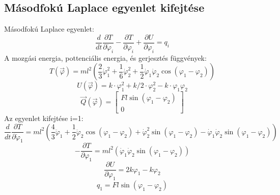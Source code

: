\documentclass[12pt,twoside]{article}
\begin{document}
\subsection{Másodfokú Laplace egyenlet kifejtése}%
Másodfokú Laplace egyenlet:
\begin{equation} \label{eq:Newton}
\frac{d}{dt}\frac{\partial T}{\partial \dot \varphi_i}-\frac{\partial T}{\partial \varphi_i}+\frac{\partial U}{\partial \varphi_i}=q_i
\end{equation}
A mozgási energia, pottenciális energia, és gerjesztés függvények:
\begin{equation} \label{eq:Newton}
T(\vec\varphi)=ml^2\left(\frac{2}{3}\dot\varphi_1^2+\frac{1}{6}\dot\varphi_2^2+
\frac{1}{2}\dot\varphi_1\dot\varphi_2 \cos(\varphi_1-\varphi_2)\right)
\end{equation}
\begin{equation} \label{eq:Newton}
U(\vec\varphi)=k \cdot \varphi_1 ^2 + k/2 \cdot\varphi_2^2 -k \cdot \varphi_1\varphi_2
\end{equation}
\begin{equation} \label{eq:Newton}
\vec Q(\vec\varphi)=
\begin{bmatrix}
Fl\sin(\varphi_1-\varphi_2) \\
0
\end{bmatrix}
\end{equation}
Az egyenlet kifejtése \newline
i=1:
\begin{equation} \label{eq:Newton}
\frac{d}{dt}\frac{\partial T}{\partial \dot \varphi_1}=
ml^2\left(\frac{4}{3} \ddot \varphi_1+\frac{1}{2}\ddot \varphi_2 \cos{(\varphi_1-\varphi_2)}+\dot\varphi_2^2\sin{(\varphi_1-\varphi_2)}-\dot\varphi_1\dot\varphi_2\sin{(\varphi_1-\varphi_2)}\right)
\end{equation}
\begin{equation} \label{eq:Newton}
-\frac{\partial T}{\partial \varphi_1}=ml^2\left(\dot\varphi_1\dot\varphi_2\sin{(\varphi_1-\varphi_2)}\right)
\end{equation}
\begin{equation} \label{eq:Newton}
\frac{\partial U}{\partial \varphi_1}=2k\varphi_1-k\varphi_2
\end{equation}
\begin{equation} \label{eq:Newton}
q_1 =Fl \sin{(\varphi_1-\varphi_2)}
\end{equation}
\end{document}
